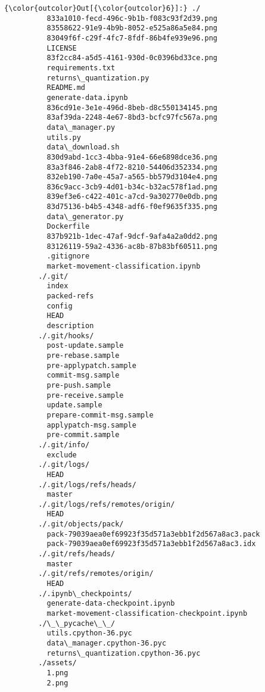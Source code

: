 \documentclass[11pt]{article}
\begin{document}
\begin{Verbatim}[commandchars=\\\{\}]
{\color{outcolor}Out[{\color{outcolor}6}]:} ./
          833a1010-fecd-496c-9b1b-f083c93f2d39.png
          83558622-91e9-4b9b-8052-e525a86a5e84.png
          83049f6f-c29f-4fc7-8fdf-86b4fe939e96.png
          LICENSE
          83f2cc84-a5d5-4161-930d-0c0396bd33ce.png
          requirements.txt
          returns\_quantization.py
          README.md
          generate-data.ipynb
          836cd91e-3e1e-496d-8beb-d8c550134145.png
          83af39da-2248-4e67-8bd3-bcfc97fc567a.png
          data\_manager.py
          utils.py
          data\_download.sh
          830d9abd-1cc3-4bba-91e4-66e6898dce36.png
          83a3f846-2ab8-4f72-8210-54406d352334.png
          832eb190-7a0e-45a7-a565-bb579d3104e4.png
          836c9acc-3cb9-4d01-b34c-b32ac578f1ad.png
          839ef3e6-c422-401c-a7cd-9a302770e0db.png
          83d75136-b4b5-4348-adf6-f0ef9635f335.png
          data\_generator.py
          Dockerfile
          837b921b-1dec-47af-9dcf-9afa4a2a0dd2.png
          83126119-59a2-4336-ac8b-87b83bf60511.png
          .gitignore
          market-movement-classification.ipynb
        ./.git/
          index
          packed-refs
          config
          HEAD
          description
        ./.git/hooks/
          post-update.sample
          pre-rebase.sample
          pre-applypatch.sample
          commit-msg.sample
          pre-push.sample
          pre-receive.sample
          update.sample
          prepare-commit-msg.sample
          applypatch-msg.sample
          pre-commit.sample
        ./.git/info/
          exclude
        ./.git/logs/
          HEAD
        ./.git/logs/refs/heads/
          master
        ./.git/logs/refs/remotes/origin/
          HEAD
        ./.git/objects/pack/
          pack-79039aea0ef69923f35d571a3ebb1f2d567a8ac3.pack
          pack-79039aea0ef69923f35d571a3ebb1f2d567a8ac3.idx
        ./.git/refs/heads/
          master
        ./.git/refs/remotes/origin/
          HEAD
        ./.ipynb\_checkpoints/
          generate-data-checkpoint.ipynb
          market-movement-classification-checkpoint.ipynb
        ./\_\_pycache\_\_/
          utils.cpython-36.pyc
          data\_manager.cpython-36.pyc
          returns\_quantization.cpython-36.pyc
        ./assets/
          1.png
          2.png
\end{Verbatim}
            
\end{document}
